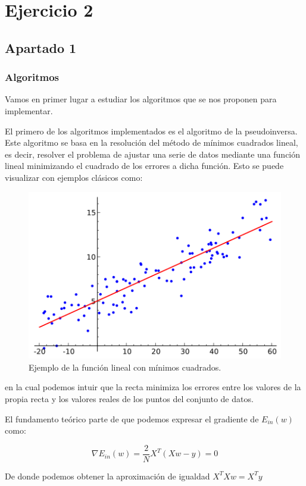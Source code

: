 \documentclass[12pt,a4paper]{article}
\begin{document}
\section{Ejercicio 2}
\subsection{Apartado 1}
\subsubsection{Algoritmos}
Vamos en primer lugar a estudiar los algoritmos que se nos proponen para implementar.

El primero de los algoritmos implementados es el algoritmo de la pseudoinversa. Este algoritmo se basa en la resolución del método de mínimos cuadrados lineal, es decir, resolver el problema de ajustar una serie de datos mediante una función lineal minimizando el cuadrado de los errores a dicha función. Esto se puede visualizar con ejemplos clásicos como:

\begin{figure}[H]
	\centering
	\includegraphics[scale=0.7]{./Imagenes/ej2-1.png}
	\caption{Ejemplo de la función lineal con mínimos cuadrados.}
	\label{ej2-1}
\end{figure}

en la cual podemos intuir que la recta minimiza los errores entre los valores de la propia recta y los valores reales de los puntos del conjunto de datos.

El fundamento teórico parte de que podemos expresar el gradiente de $E_{in}(w)$ como:

$$\nabla E_{in}(w) = \frac{2}{N}X^T (Xw - y) = 0$$

De donde podemos obtener la aproximación de igualdad $X^T X w = X^T y$
\end{document}
